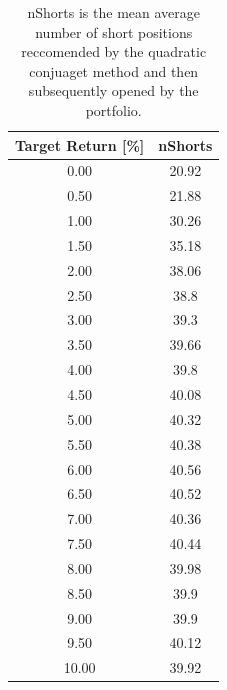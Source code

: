 \documentclass{article}
\begin{document}
\begin{center}
	\begin{table}[H]
		\begin{tabular}{|c c |} 
			\hline
			Target Return [\%] & nShorts \\ [0.5ex] \hline \hline
					0.00	& 20.92 \\ \hline
					0.50 	& 21.88 \\ \hline
					1.00 	& 30.26 \\ \hline
					1.50	 & 35.18 \\ \hline
					2.00 	& 38.06 \\ \hline
					2.50 	& 38.8 \\ \hline
					3.00 	& 39.3 \\ \hline
					3.50 	& 39.66 \\ \hline
					4.00 	& 39.8 \\ \hline
					4.50	 & 40.08 \\ \hline
					5.00	& 40.32 \\ \hline
					5.50 	& 40.38 \\ \hline
					6.00 	& 40.56 \\ \hline
					6.50 	& 40.52 \\ \hline
					7.00 	& 40.36 \\ \hline
					7.50 	& 40.44 \\ \hline
					8.00	& 39.98 \\ \hline
					8.50 	& 39.9 \\ \hline
					9.00	& 39.9 \\ \hline
					9.50 	& 40.12 \\ \hline
					10.00	& 39.92 \\ [1ex] \hline
		\end{tabular}
		\caption{nShorts is the mean average number of short positions reccomended by the quadratic conjuaget method and then subsequently opened by the portfolio.}
		\label{table:nShorts}
	\end{table}
\end{center}
\end{document}
